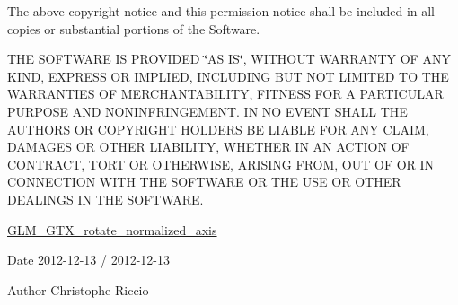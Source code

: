 The above copyright notice and this permission notice shall be included in all copies or substantial portions of the Software.

T\+HE S\+O\+F\+T\+W\+A\+RE IS P\+R\+O\+V\+I\+D\+ED \char`\"{}\+A\+S I\+S\char`\"{}, W\+I\+T\+H\+O\+UT W\+A\+R\+R\+A\+N\+TY OF A\+NY K\+I\+ND, E\+X\+P\+R\+E\+SS OR I\+M\+P\+L\+I\+ED, I\+N\+C\+L\+U\+D\+I\+NG B\+UT N\+OT L\+I\+M\+I\+T\+ED TO T\+HE W\+A\+R\+R\+A\+N\+T\+I\+ES OF M\+E\+R\+C\+H\+A\+N\+T\+A\+B\+I\+L\+I\+TY, F\+I\+T\+N\+E\+SS F\+OR A P\+A\+R\+T\+I\+C\+U\+L\+AR P\+U\+R\+P\+O\+SE A\+ND N\+O\+N\+I\+N\+F\+R\+I\+N\+G\+E\+M\+E\+NT. IN NO E\+V\+E\+NT S\+H\+A\+LL T\+HE A\+U\+T\+H\+O\+RS OR C\+O\+P\+Y\+R\+I\+G\+HT H\+O\+L\+D\+E\+RS BE L\+I\+A\+B\+LE F\+OR A\+NY C\+L\+A\+IM, D\+A\+M\+A\+G\+ES OR O\+T\+H\+ER L\+I\+A\+B\+I\+L\+I\+TY, W\+H\+E\+T\+H\+ER IN AN A\+C\+T\+I\+ON OF C\+O\+N\+T\+R\+A\+CT, T\+O\+RT OR O\+T\+H\+E\+R\+W\+I\+SE, A\+R\+I\+S\+I\+NG F\+R\+OM, O\+UT OF OR IN C\+O\+N\+N\+E\+C\+T\+I\+ON W\+I\+TH T\+HE S\+O\+F\+T\+W\+A\+RE OR T\+HE U\+SE OR O\+T\+H\+ER D\+E\+A\+L\+I\+N\+GS IN T\+HE S\+O\+F\+T\+W\+A\+RE.

\hyperlink{group__gtx__rotate__normalized__axis}{G\+L\+M\+\_\+\+G\+T\+X\+\_\+rotate\+\_\+normalized\+\_\+axis}

\begin{DoxyDate}{Date}
2012-\/12-\/13 / 2012-\/12-\/13 
\end{DoxyDate}
\begin{DoxyAuthor}{Author}
Christophe Riccio 
\end{DoxyAuthor}
